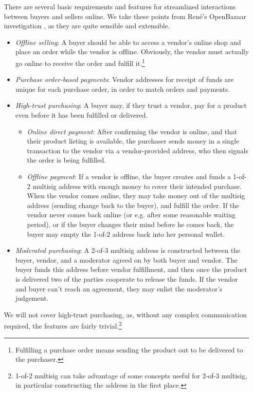 There are several basic requirements and features for streamlined interactions between buyers and sellers online. We take these points from Ren\'e's OpenBazaar investigation  \cite{openbazaar-rbrunner-investigation}, as they are quite sensible and extensible.
\begin{itemize}
    \item {\em Offline selling}: A buyer should be able to access a vendor's online shop and place an order while the vendor is offline. Obviously, the vendor must actually go online to receive the order and fulfill it.\footnote{Fulfilling a purchase order means sending the product out to be delivered to the purchaser.}
    \item {\em Purchase order-based payments}: Vendor addresses for receipt of funds are unique for each purchase order, in order to match orders and payments.
    \item {\em High-trust purchasing}: A buyer may, if they trust a vendor, pay for a product even before it has been fulfilled or delivered.
    \begin{itemize}
        \item {\em Online direct payment}: After confirming the vendor is online, and that their product listing is available, the purchaser sends money in a single transaction to the vendor via a vendor-provided address, who then signals the order is being fulfilled.
        \item {\em Offline payment}: If a vendor is offline, the buyer creates and funds a 1-of-2 multisig address with enough money to cover their intended purchase. When the vendor comes online, they may take money out of the multisig address (sending change back to the buyer), and fulfill the order. If the vendor never comes back online (or e.g. after some reasonable waiting period), or if the buyer changes their mind before he comes back, the buyer may empty the 1-of-2 address back into her personal wallet.
    \end{itemize}{}
    \item {\em Moderated purchasing}: A 2-of-3 multisig address is constructed between the buyer, vendor, and a moderator agreed on by both buyer and vendor. The buyer funds this address before vendor fulfillment, and then once the product is delivered two of the parties cooperate to release the funds. If the vendor and buyer can't reach an agreement, they may enlist the moderator's judgement.
\end{itemize}

We will not cover high-trust purchasing, as, without any complex communication required, the features are fairly trivial.\footnote{1-of-2 multisig can take advantage of some concepts useful for 2-of-3 multisig, in particular constructing the address in the first place.}


